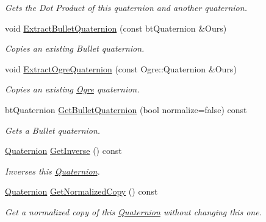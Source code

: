 \begin{DoxyCompactItemize}
\begin{DoxyCompactList}\small\item\em Gets the Dot Product of this quaternion and another quaternion. \item\end{DoxyCompactList}\item 
void \hyperlink{classMezzanine_1_1Quaternion_ad7d7badf6fff44472fea618647866d8c}{ExtractBulletQuaternion} (const btQuaternion \&Ours)
\begin{DoxyCompactList}\small\item\em Copies an existing Bullet quaternion. \item\end{DoxyCompactList}\item 
void \hyperlink{classMezzanine_1_1Quaternion_a7d5ae58c94f439d185939a58c773df80}{ExtractOgreQuaternion} (const Ogre::Quaternion \&Ours)
\begin{DoxyCompactList}\small\item\em Copies an existing \hyperlink{namespaceOgre}{Ogre} quaternion. \item\end{DoxyCompactList}\item 
btQuaternion \hyperlink{classMezzanine_1_1Quaternion_a6d6b23f7ca6e8521873cd7c6198d7613}{GetBulletQuaternion} (bool normalize=false) const 
\begin{DoxyCompactList}\small\item\em Gets a Bullet quaternion. \item\end{DoxyCompactList}\item 
\hyperlink{classMezzanine_1_1Quaternion}{Quaternion} \hyperlink{classMezzanine_1_1Quaternion_a37552234f4b725e17eedf584e011f36e}{GetInverse} () const 
\begin{DoxyCompactList}\small\item\em Inverses this \hyperlink{classMezzanine_1_1Quaternion}{Quaternion}. \item\end{DoxyCompactList}\item 
\hyperlink{classMezzanine_1_1Quaternion}{Quaternion} \hyperlink{classMezzanine_1_1Quaternion_ae61b999fb8fd2ce0dd6b8aac5230d40b}{GetNormalizedCopy} () const 
\begin{DoxyCompactList}\small\item\em Get a normalized copy of this \hyperlink{classMezzanine_1_1Quaternion}{Quaternion} without changing this one. \item\end{DoxyCompactList}\item 

\end{DoxyCompactItemize}
